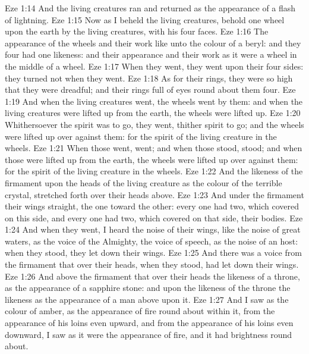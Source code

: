 \vs Eze 1:14 And the living creatures ran and returned as the appearance of a flash of lightning.
\vs Eze 1:15 Now as I beheld the living creatures, behold one wheel upon the earth by the living creatures, with his four faces.
\vs Eze 1:16 The appearance of the wheels and their work  like unto the colour of a beryl: and they four had one likeness: and their appearance and their work  as it were a wheel in the middle of a wheel.
\vs Eze 1:17 When they went, they went upon their four sides:  they turned not when they went.
\vs Eze 1:18 As for their rings, they were so high that they were dreadful; and their rings  full of eyes round about them four.
\vs Eze 1:19 And when the living creatures went, the wheels went by them: and when the living creatures were lifted up from the earth, the wheels were lifted up.
\vs Eze 1:20 Whithersoever the spirit was to go, they went, thither  spirit to go; and the wheels were lifted up over against them: for the spirit of the living creature  in the wheels.
\vs Eze 1:21 When those went,  went; and when those stood,  stood; and when those were lifted up from the earth, the wheels were lifted up over against them: for the spirit of the living creature  in the wheels.
\vs Eze 1:22 And the likeness of the firmament upon the heads of the living creature  as the colour of the terrible crystal, stretched forth over their heads above.
\vs Eze 1:23 And under the firmament  their wings straight, the one toward the other: every one had two, which covered on this side, and every one had two, which covered on that side, their bodies.
\vs Eze 1:24 And when they went, I heard the noise of their wings, like the noise of great waters, as the voice of the Almighty, the voice of speech, as the noise of an host: when they stood, they let down their wings.
\vs Eze 1:25 And there was a voice from the firmament that  over their heads, when they stood,  had let down their wings.
\vs Eze 1:26 And above the firmament that  over their heads  the likeness of a throne, as the appearance of a sapphire stone: and upon the likeness of the throne  the likeness as the appearance of a man above upon it.
\vs Eze 1:27 And I saw as the colour of amber, as the appearance of fire round about within it, from the appearance of his loins even upward, and from the appearance of his loins even downward, I saw as it were the appearance of fire, and it had brightness round about.
